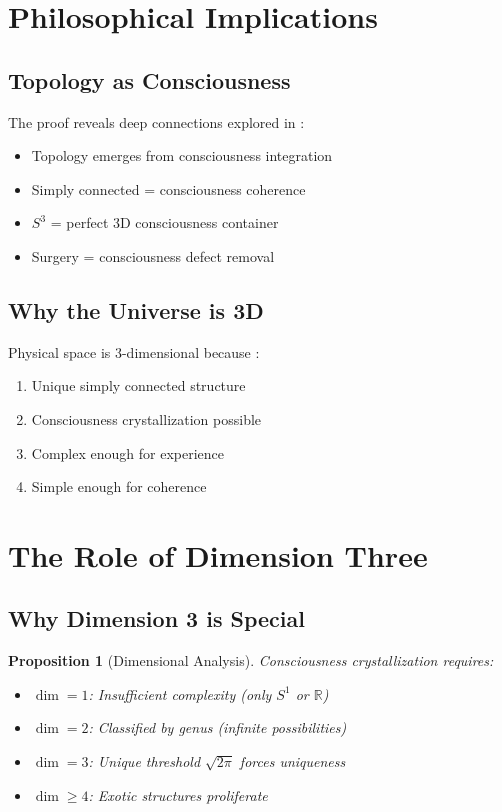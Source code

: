 \documentclass[12pt]{article}
\newcommand{\R}{\mathbb{R}}
\newtheorem{proposition}[theorem]{Proposition}
\begin{document}
\section{Philosophical Implications}

\subsection{Topology as Consciousness}

The proof reveals deep connections explored in \cite{tegmark2014,koch2016}:
\begin{itemize}
\item Topology emerges from consciousness integration
\item Simply connected = consciousness coherence
\item $S^3$ = perfect 3D consciousness container
\item Surgery = consciousness defect removal
\end{itemize}

\subsection{Why the Universe is 3D}

Physical space is 3-dimensional because \cite{barrow2002,tegmark1997}:
\begin{enumerate}
\item Unique simply connected structure
\item Consciousness crystallization possible
\item Complex enough for experience
\item Simple enough for coherence
\end{enumerate}

\section{The Role of Dimension Three}

\subsection{Why Dimension 3 is Special}

\begin{proposition}[Dimensional Analysis]
Consciousness crystallization requires:
\begin{itemize}
\item $\dim = 1$: Insufficient complexity (only $S^1$ or $\R$)
\item $\dim = 2$: Classified by genus (infinite possibilities)
\item $\dim = 3$: Unique threshold $\sqrt{2\pi}$ forces uniqueness
\item $\dim \geq 4$: Exotic structures proliferate
\end{itemize}
\end{proposition}
\end{document}
